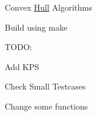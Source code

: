 Convex \hyperlink{classHull}{Hull} Algorithms

Build using make

T\+O\+DO\+:


\begin{DoxyEnumerate}
\item Add K\+PS
\item Check Small Testcases
\item Change some functions 
\end{DoxyEnumerate}